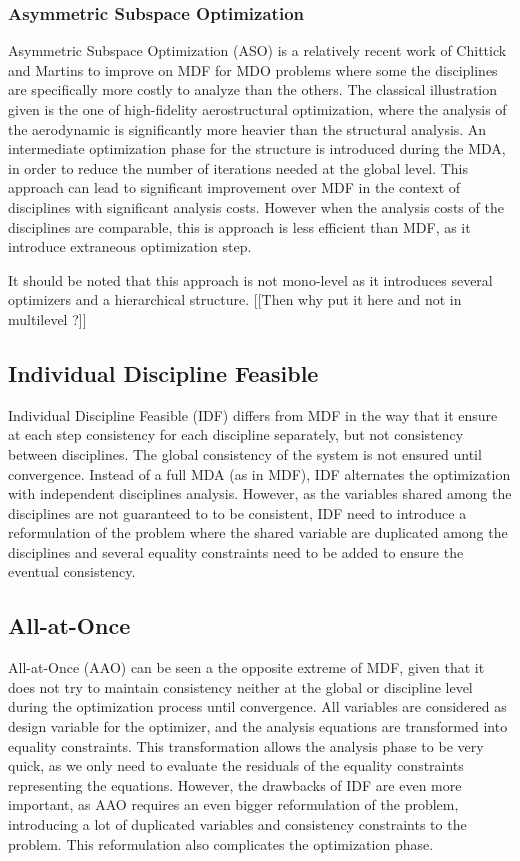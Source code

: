 \subsubsection{Asymmetric Subspace Optimization}

Asymmetric Subspace Optimization (ASO) is a relatively recent work of Chittick and Martins\cite{Chittick:2007:B} to improve on MDF for MDO problems where some the disciplines are specifically more costly to analyze than the others. The classical illustration given is the one of high-fidelity aerostructural optimization, where the analysis of the aerodynamic is significantly more heavier than the structural analysis. An intermediate optimization phase for the structure is introduced during the MDA, in order to reduce the number of iterations needed at the global level.
This approach can lead to significant improvement over MDF in the context of disciplines with significant analysis costs. However when the analysis costs of the disciplines are comparable, this is approach is less efficient than MDF, as it introduce extraneous optimization step.

It should be noted that this approach is not mono-level as it introduces several optimizers and a hierarchical structure. [[Then why put it here and not in multilevel ?]] 

\subsection{Individual Discipline Feasible}

Individual Discipline Feasible (IDF) differs from MDF in the way that it ensure at each step consistency for each discipline separately, but not consistency between disciplines. The global consistency of the system is not ensured until convergence.
Instead of a full MDA (as in MDF), IDF alternates the optimization with independent disciplines analysis.
However, as the variables shared among the disciplines are not guaranteed to to be consistent, IDF need to introduce a reformulation of the problem where the shared variable are duplicated among the disciplines and several equality constraints need to be added to ensure the eventual consistency.

\subsection{All-at-Once}

All-at-Once (AAO) can be seen a the opposite extreme of MDF, given that it does not try to maintain consistency neither at the global or discipline level during the optimization process until convergence.
All variables are considered as design variable for the optimizer, and the analysis equations are transformed into equality constraints.
This transformation allows the analysis phase to be very quick, as we only need to evaluate the residuals of the equality constraints representing the equations.
However, the drawbacks of IDF are even more important, as AAO requires an even bigger reformulation of the problem, introducing a lot of duplicated variables and consistency  constraints to the problem. This reformulation also complicates the optimization phase.

